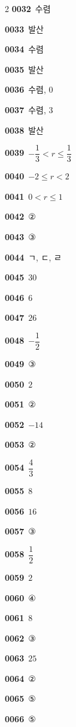 \documentclass[10pt,a4paper]{article}
\begin{document}
\begin{multicols}{2}
\noindent\textbf{0032}\ 수렴\par
\noindent\textbf{0033}\ 발산\par
\noindent\textbf{0034}\ 수렴\par
\noindent\textbf{0035}\ 발산\par
\noindent\textbf{0036}\ 수렴, $0$\par
\noindent\textbf{0037}\ 수렴, $3$\par
\noindent\textbf{0038}\ 발산\par
\noindent\textbf{0039}\ $-\dfrac{1}{3}<r\le\dfrac{1}{3}$\par
\noindent\textbf{0040}\ $-2\le r<2$\par
\noindent\textbf{0041}\ $0<r\le 1$\par
\noindent\textbf{0042}\ ②\par
\noindent\textbf{0043}\ ③\par
\noindent\textbf{0044}\ ㄱ, ㄷ, ㄹ\par
\noindent\textbf{0045}\ $30$\par
\noindent\textbf{0046}\ $6$\par
\noindent\textbf{0047}\ $26$\par
\noindent\textbf{0048}\ $-\dfrac{1}{2}$\par
\noindent\textbf{0049}\ ③\par
\noindent\textbf{0050}\ $2$\par
\noindent\textbf{0051}\ ②\par
\noindent\textbf{0052}\ $-14$\par
\noindent\textbf{0053}\ ②\par
\noindent\textbf{0054}\ $\dfrac{4}{3}$\par
\noindent\textbf{0055}\ $8$\par
\noindent\textbf{0056}\ $16$\par
\noindent\textbf{0057}\ ③\par
\noindent\textbf{0058}\ $\dfrac{1}{2}$\par
\noindent\textbf{0059}\ $2$\par
\noindent\textbf{0060}\ ④\par
\noindent\textbf{0061}\ $8$\par
\noindent\textbf{0062}\ ③\par
\noindent\textbf{0063}\ $25$\par
\noindent\textbf{0064}\ ②\par
\noindent\textbf{0065}\ ⑤\par
\noindent\textbf{0066}\ ⑤\par

\end{multicols}
\end{document}
